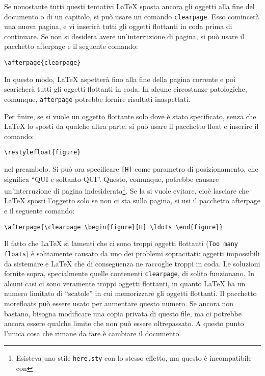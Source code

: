 \documentclass[a4paper,italian]{article}
\def\latex/{\protect\LaTeX{}}
\newcommand{\bs}{\symbol{'134}}
\newcommand{\Cmd}[1]{\texttt{\def\{{\char`\{}\def\}{\char`\}}\bs#1}}
\begin{document}
Se nonostante tutti questi tentativi \latex/ sposta ancora gli oggetti
alla fine del documento o di un capitolo, si pu\`o usare un comando
\Cmd{clearpage}. Esso comincer\`a una nuova pagina, e vi inserir\`a tutti gli
oggetti flottanti in coda prima di continuare. Se non si desidera avere
un'interruzione di pagina, si pu\`o usare il pacchetto \textsf{afterpage}
e il seguente comando:
\begin{verbatim}
\afterpage{clearpage}
\end{verbatim}

In questo modo, \latex/ aspetter\`a fino alla fine della pagina corrente e
poi scaricher\`a tutti gli oggetti flottanti in coda. In alcune circostanze
patologiche, comunque, \texttt{afterpage} potrebbe fornire risultati inaspettati.

Per finire, se si vuole un oggetto flottante solo dove \`e stato specificato,
senza che \latex/ lo sposti da qualche altra parte, si pu\`o usare il pacchetto
\textsf{float} e inserire il comando:
\begin{verbatim}
\restylefloat{figure}
\end{verbatim}
nel preambolo. Si pu\`o ora specificare \texttt{[H]} come parametro di
posizionamento, che significa ``QUI e soltanto QUI''. Questo, comunque,
potrebbe causare un'interruzione di pagina indesiderata\footnote{Esisteva
uno stile \texttt{here.sty} con lo stesso effetto, ma questo \`e
incompatibile con \LaTeXe}. Se la si vuole evitare, cio\`e lasciare che
\LaTeX{} sposti l'oggetto solo se non ci sta sulla pagina, si usi il pacchetto
\textsf{afterpage} e il seguente comando:
\begin{verbatim}
\afterpage{\clearpage \begin{figure}[H] \ldots \end{figure}}
\end{verbatim}

Il fatto che \latex/ si lamenti che ci sono troppi oggetti flottanti
(\texttt{Too many floats}) \`e solitamente causato da uno dei problemi sopracitati:
oggetti impossibili da sistemare e \latex/ che di conseguenza ne raccoglie
troppi in coda. Le soluzioni fornite sopra, specialmente quelle contenenti
\Cmd{clearpage}, di solito funzionano. In alcuni casi ci sono veramente
troppi oggetti flottanti, in quanto \latex/ ha un numero limitato di
``scatole'' in cui memorizzare gli oggetti flottanti. Il pacchetto
\textsf{morefloats} pu\`o essere usato per aumentare questo numero. Se ancora
non bastano, bisogna modificare una copia privata di questo file,
ma ci potrebbe ancora essere qualche limite che non pu\`o essere oltrepassato.
A questo punto l'unica cosa che rimane da fare \`e cambiare il documento.
\end{document}
